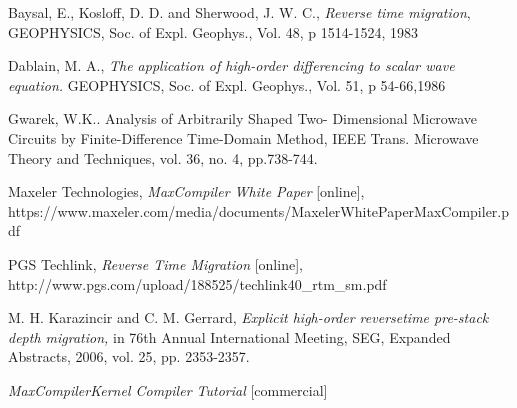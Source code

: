 \begin{thebibliography}{9}
   Baysal, E., Kosloff, D. D. and Sherwood, J. W. C.,
    \emph{Reverse time migration}, GEOPHYSICS, Soc. of Expl.
    Geophys., Vol. 48, p 1514-1524, 1983

  Dablain, M. A.,
    \emph{The application of high-order
    differencing to scalar wave equation.} GEOPHYSICS, Soc. of
    Expl. Geophys., Vol. 51, p 54-66,1986

   Gwarek, W.K.. {Analysis of Arbitrarily Shaped Two-
      Dimensional Microwave Circuits by Finite-Difference
    Time-Domain Method,}
    IEEE Trans. Microwave Theory and Techniques, vol. 36, no. 4, pp.738-744.

    Maxeler Technologies,
    \emph{MaxCompiler White Paper} [online],
    https://www.maxeler.com/media/documents/MaxelerWhitePaperMaxCompiler.pdf

    PGS Techlink,
    \emph{Reverse Time Migration} [online],
    http://www.pgs.com/upload/188525/techlink40\_rtm\_sm.pdf

    M. H. Karazincir and C. M. Gerrard,
    \emph{Explicit high-order reversetime pre-stack depth migration,}
    in 76th Annual International Meeting, SEG, Expanded Abstracts, 2006,
    vol. 25, pp. 2353-2357.

    \emph{MaxCompilerKernel Compiler Tutorial} [commercial]

\end{thebibliography}
